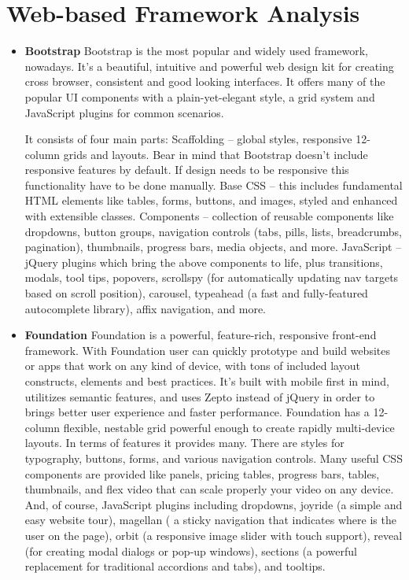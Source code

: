 \section{Web-based Framework Analysis}
 \begin{itemize}
	\item \textbf{Bootstrap}
	\newline
	Bootstrap is the most popular and widely used framework, nowadays. It’s a beautiful, intuitive and powerful web design kit for creating cross browser, consistent and good looking interfaces. It offers many of the popular UI components with a plain-yet-elegant style, a grid system and JavaScript plugins for common scenarios.

	It consists of four main parts:
	Scaffolding – global styles, responsive 12-column grids and layouts. Bear in mind that Bootstrap doesn’t include responsive features by default. If design needs to be responsive this functionality have to be done manually. Base CSS – this includes fundamental HTML elements like tables, forms, buttons, and images, styled and enhanced with extensible classes. Components – collection of reusable components like dropdowns, button groups, navigation controls (tabs, pills, lists, breadcrumbs, pagination), thumbnails, progress bars, media objects, and more. JavaScript – jQuery plugins which bring the above components to life, plus transitions, modals, tool tips, popovers, scrollspy (for automatically updating nav targets based on scroll position), carousel, typeahead (a fast and fully-featured autocomplete library), affix navigation, and more.
	\item \textbf{Foundation}
	\newline
	Foundation is a powerful, feature-rich, responsive front-end framework. With Foundation user can quickly prototype and build websites or apps that work on any kind of device, with tons of included layout constructs, elements and best practices. It’s built with mobile first in mind, utilitizes semantic features, and uses Zepto instead of jQuery in order to brings better user experience and faster performance.
	\newline
	Foundation has a 12-column flexible, nestable grid powerful enough to create rapidly multi-device layouts. In terms of features it provides many. There are styles for typography, buttons, forms, and various navigation controls. Many useful CSS components are provided like panels, pricing tables, progress bars, tables, thumbnails, and flex video that can scale properly your video on any device. And, of course, JavaScript plugins including dropdowns, joyride (a simple and easy website tour), magellan ( a sticky navigation that indicates where is the user on the page), orbit (a responsive image slider with touch support), reveal (for creating modal dialogs or pop-up windows),  sections (a powerful replacement for traditional accordions and tabs), and tooltips.

\end{itemize}
